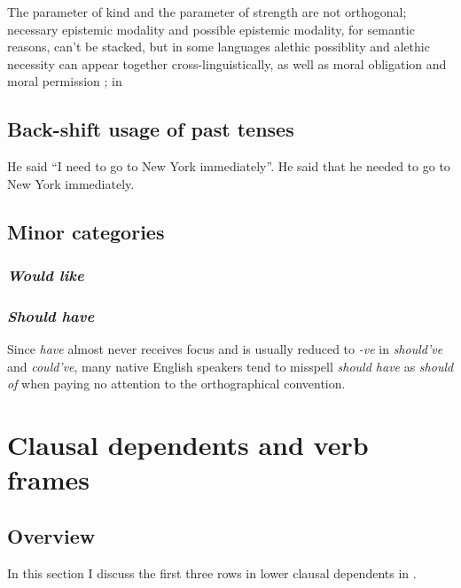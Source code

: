 \documentclass[UTF8, a4paper, oneside, scheme=plain, 12pt]{ctexbook}
\newcommand*{\citepage}[1]{p.~{#1}}
\newcommand{\form}[1]{\emph{#1}}
\begin{document}
The parameter of kind and the parameter of strength
are not orthogonal;
necessary epistemic modality and possible epistemic modality, 
for semantic reasons, can't be stacked,
but in some languages alethic possiblity and alethic necessity can appear together cross-linguistically,
as well as moral obligation and moral permission
\citep[\citepage{80}]{cinque1999adverbs};
in 


\subsection{Back-shift usage of past tenses}

\begin{exe}
    \ex \begin{xlist}
        \ex He said ``I need to go to New York immediately''.
        \ex He said that he needed to go to New York immediately.
    \end{xlist}
\end{exe}

\subsection{Minor categories}\label{sec:verb-inflection.modal-use}

\subsubsection{\form{Would like}}

\subsubsection{\form{Should have}}

Since \form{have} almost never receives focus
and is usually reduced to \form{-ve} in \form{should've} and \form{could've},
many native English speakers 
tend to misspell \form{should have} as \form{should of}
when paying no attention to the orthographical convention.

\section{Clausal dependents and verb frames}\label{sec:valency.overview}

\subsection{Overview}

In this section I discuss the first three rows in 
lower clausal dependents in .
\end{document}
